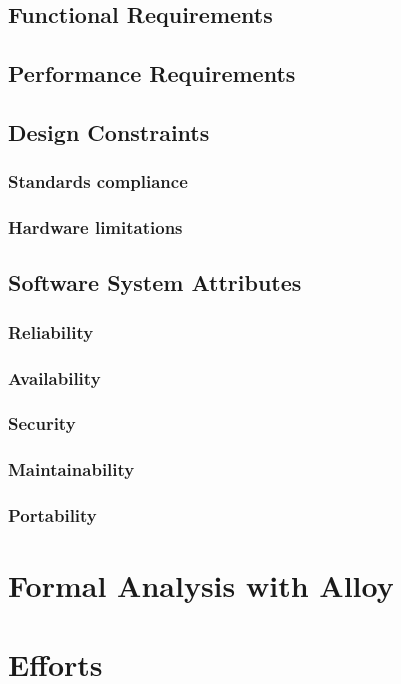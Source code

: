 \documentclass{article}
\begin{document}
\subsection{Functional Requirements}

\subsection{Performance Requirements}

\subsection{Design Constraints}
\subsubsection{Standards compliance}
\subsubsection{Hardware limitations}

\subsection{Software System Attributes}
\subsubsection{Reliability}
\subsubsection{Availability}
\subsubsection{Security}
\subsubsection{Maintainability}
\subsubsection{Portability}

\section{Formal Analysis with Alloy}

\section{Efforts}




    
\end{document}
